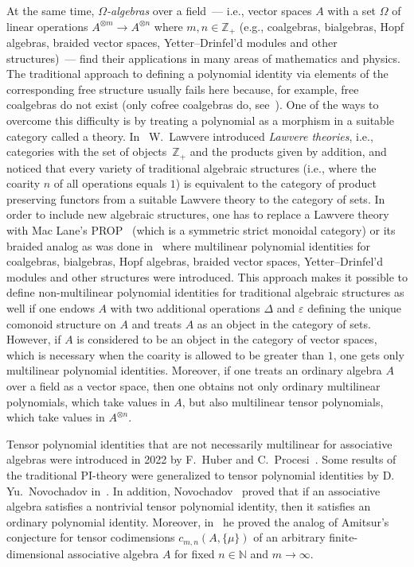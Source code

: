 \documentclass[12pt, reqno, a4paper]{amsart}
\theoremstyle{plain}
\theoremstyle{remark}
\theoremstyle{definition}
\numberwithin{equation}{section}
\begin{document}
At the same time, \textit{$\Omega$-algebras} over a field~--- i.e., vector spaces $A$ with a set $\Omega$ of linear operations $A^{\otimes m} \to A^{\otimes n}$ where $m,n \in \mathbb Z_+$ (e.g., coalgebras, bialgebras, Hopf algebras, braided vector spaces, Yetter--Drinfel'd modules and other structures)~--- find their applications in many areas of mathematics and physics. 
 The traditional approach to defining a polynomial identity via elements of the corresponding free structure usually fails here because, for example, free coalgebras do not exist (only cofree coalgebras do, see~\cite[Section~6.4]{SweedlerBook}).
 One of the ways to overcome this difficulty is by treating a polynomial as a morphism in a suitable category called a theory.
 In~\cite{Lawvere} W.~Lawvere introduced \textit{Lawvere theories}, i.e., categories with the set of objects~$\mathbb{Z}_+$ and
 the products given by addition, and noticed that every variety of traditional algebraic structures (i.e., where the coarity $n$
 of all operations equals $1$) is equivalent to the category of product preserving functors from a suitable Lawvere theory to the category of sets. In order to include new algebraic structures, one has to replace a Lawvere theory with Mac Lane's PROP~\cite{MacLane65} (which is a symmetric strict monoidal category) or its braided analog as was done in~\cite{ASGordienko23} where  
 multilinear polynomial identities for coalgebras, bialgebras, Hopf algebras, braided vector spaces, Yetter--Drinfel'd modules and other structures were introduced. This approach makes it possible to define non-multilinear polynomial identities for traditional algebraic structures as well if one endows $A$ with two additional operations $\Delta$ and $\varepsilon$ defining the unique comonoid structure on $A$ and treats $A$ as an object in the category of sets.
 However, if $A$ is considered to be an object in the category of vector spaces, which is necessary when the coarity is allowed to be greater than $1$, one gets only multilinear polynomial identities. Moreover, if one treats an ordinary algebra $A$ over a field as a vector space, then one obtains not only ordinary multilinear polynomials, which take values in $A$, but also multilinear tensor polynomials, which take values in $A^{\otimes n}$. 
 
 Tensor polynomial identities  that are not necessarily multilinear for associative algebras were introduced in 2022 by F.~Huber and C.~Procesi~\cite{HuberProcesi}. Some results of the traditional PI-theory were generalized to tensor polynomial identities
 by D.\,Yu.~Novochadov in~\cite{Novochadov}. In addition, Novochadov~\cite[Proposition~1.4]{Novochadov} proved that if an associative algebra satisfies a nontrivial tensor polynomial identity, then it satisfies an ordinary polynomial identity.
 Moreover, in~\cite[Corollary~7.4]{Novochadov} he proved the analog of Amitsur's conjecture
 for tensor codimensions $c_{m,n}(A,\lbrace \mu \rbrace)$ of an arbitrary finite-dimensional associative algebra $A$ for fixed $n\in\mathbb N$
 and $m\to\infty$.
 
\end{document}

